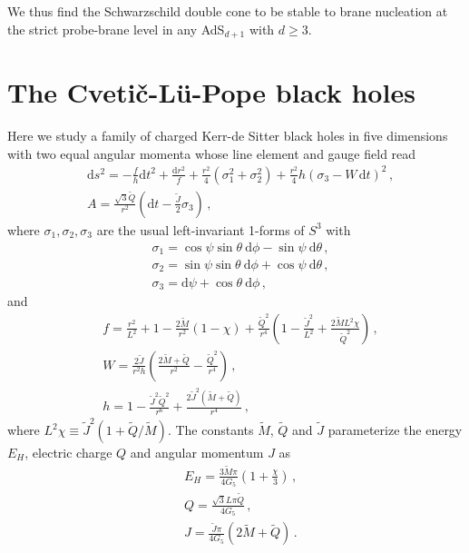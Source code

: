 \documentclass[11pt]{article}
\begin{document}
We thus find the Schwarzschild double cone to be stable to brane nucleation at the strict probe-brane level in any AdS$_{d+1}$ with $d\geq 3$.

\section{\label{sec:CMP}The Cveti\v{c}-L\"u-Pope black holes}
Here we study a family of charged Kerr-de Sitter black holes in five dimensions with two equal angular momenta whose line element and gauge field read
\begin{subequations}
\begin{align}
&\mathrm{d}s^2 = -\frac{f}{h}\mathrm{d}t^2+\frac{\mathrm{d}r^2}{f}+\frac{r^2}{4}(\sigma_1^2+\sigma_2^2)+\frac{r^2}{4}h\left(\sigma_3-W\, \mathrm{d}t\right)^2\,,
\label{eq:5Dg}
\\
& A = \frac{\sqrt{3}\tilde{Q}}{r^2}\left(\mathrm{d}t-\frac{\tilde{J}}{2}\sigma_3 \right)\,,
\end{align}
\label{eq:5D}%
\end{subequations}
where $\sigma_1, \sigma_2, \sigma_3$ are the usual left-invariant 1-forms of $S^3$ with
\begin{subequations}
\begin{align}
&\sigma_1 =\cos\psi\sin\theta~\mathrm{d}\phi-\sin\psi~\mathrm{d}\theta \,,
\label{eq:sigma1}
\\
&\sigma_2=\sin\psi\sin\theta~\mathrm{d}\phi+\cos\psi~\mathrm{d}\theta\,,
\label{eq:sigma2}
\\
&\sigma_3=\mathrm{d}\psi+\cos\theta~\mathrm{d}\phi\,,
\end{align}
\label{eq:sigma3}%
\end{subequations}
and
\begin{subequations}
\begin{align}
    &f = \frac{r^2}{L^2}+1-\frac{2 \tilde{M}}{r^2}\left(1-\chi\right)+\frac{\tilde{Q}^2}{r^4}\left(1-\frac{\tilde{J}^2}{L^2}+\frac{2\tilde{M} L^2 \chi}{\tilde{Q}^2}\right)\,,
    \\
    & W = \frac{2\tilde{J}}{r^2 h}\left(\frac{2 \tilde{M}+\tilde{Q}}{r^2}-\frac{\tilde{Q}^2}{r^4}\right)\,,
    \\
    & h = 1-\frac{\tilde{J}^2 \tilde{Q}^2}{r^6}+\frac{2 \tilde{J}^2 (\tilde{M}+\tilde{Q})}{r^4}\,,
\end{align}
\end{subequations}
where $L^2\chi \equiv \tilde{J}^2(1+\tilde{Q}/\tilde{M})$.
The constants $\tilde{M}$, $\tilde{Q}$ and $\tilde{J}$ parameterize the energy $E_H$, electric charge $Q$ and angular momentum $J$ as
\begin{subequations}
\begin{align}
&E_H = \frac{3 \tilde{M}\pi}{4 G_5}\left(1+\frac{\chi}{3}\right)\,,
\\
& Q = \frac{\sqrt{3} L \pi \tilde{Q}}{4 G_5}\,,
\\
& J = \frac{\tilde{J} \pi}{4 G_5}(2\tilde{M}+\tilde{Q})\,.
\end{align}
\end{subequations}
\end{document}
